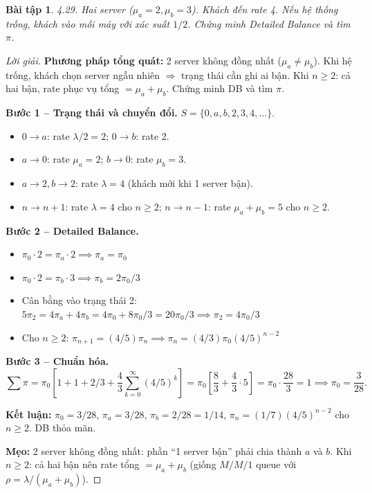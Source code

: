 \documentclass[8pt,a4paper]{article}
\newtheorem{exercise}{Bài tập}
\newenvironment{solution}{\begin{proof}[Lời giải]}{\end{proof}}
\begin{document}
\begin{exercise}
4.29. Hai server ($\mu_a=2, \mu_b=3$). Khách đến rate 4. Nếu hệ thống trống, khách vào mỗi máy với xác suất $1/2$. Chứng minh Detailed Balance và tìm $\pi$.
\end{exercise}
\begin{solution}
\textbf{Phương pháp tổng quát:} 2 server không đồng nhất ($\mu_a \neq \mu_b$). Khi hệ trống, khách chọn server ngẫu nhiên $\Rightarrow$ trạng thái cần ghi ai bận. Khi $n \ge 2$: cả hai bận, rate phục vụ tổng $= \mu_a + \mu_b$. Chứng minh DB và tìm $\pi$.

\textbf{Bước 1 -- Trạng thái và chuyển đổi.} $S = \{0, a, b, 2, 3, 4, \dots\}$.
\begin{itemize}[nosep]
\item $0 \to a$: rate $\lambda/2 = 2$; $0 \to b$: rate 2.
\item $a \to 0$: rate $\mu_a = 2$; $b \to 0$: rate $\mu_b = 3$.
\item $a \to 2, b \to 2$: rate $\lambda = 4$ (khách mới khi 1 server bận).
\item $n \to n+1$: rate $\lambda = 4$ cho $n \ge 2$; $n \to n-1$: rate $\mu_a + \mu_b = 5$ cho $n \ge 2$.
\end{itemize}

\textbf{Bước 2 -- Detailed Balance.}
\begin{itemize}[nosep]
\item $\pi_0 \cdot 2 = \pi_a \cdot 2 \implies \pi_a = \pi_0$
\item $\pi_0 \cdot 2 = \pi_b \cdot 3 \implies \pi_b = 2\pi_0/3$
\item Cân bằng vào trạng thái 2: $5\pi_2 = 4\pi_a + 4\pi_b = 4\pi_0 + 8\pi_0/3 = 20\pi_0/3 \implies \pi_2 = 4\pi_0/3$
\item Cho $n \ge 2$: $\pi_{n+1} = (4/5)\pi_n \implies \pi_n = (4/3)\pi_0 (4/5)^{n-2}$
\end{itemize}

\textbf{Bước 3 -- Chuẩn hóa.}
\[
\sum \pi = \pi_0\left[1 + 1 + 2/3 + \frac{4}{3}\sum_{k=0}^\infty (4/5)^k\right] = \pi_0\left[\frac{8}{3} + \frac{4}{3} \cdot 5\right] = \pi_0 \cdot \frac{28}{3} = 1 \implies \pi_0 = \frac{3}{28}.
\]

\textbf{Kết luận:} $\boxed{\pi_0 = 3/28}$, $\pi_a = 3/28$, $\pi_b = 2/28 = 1/14$, $\pi_n = (1/7)(4/5)^{n-2}$ cho $n \ge 2$. DB thỏa mãn.

\textbf{Mẹo:} 2 server không đồng nhất: phần ``1 server bận'' phải chia thành $a$ và $b$. Khi $n \ge 2$: cả hai bận nên rate tổng $= \mu_a + \mu_b$ (giống $M/M/1$ queue với $\rho = \lambda/(\mu_a+\mu_b)$).
\end{solution}
\end{document}
